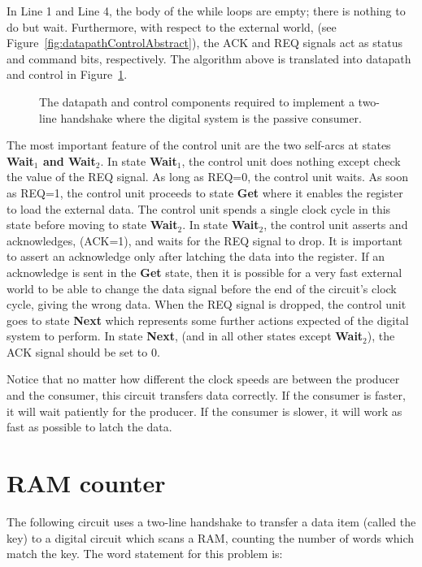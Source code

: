 In Line 1 and Line 4, the body of the while loops are empty; there is nothing
to do but wait.  Furthermore, with respect to the external world, (see
Figure~\ref{fig:datapathControlAbstract}), the ACK and REQ signals act as status and
command bits, respectively.  The algorithm above is translated into
datapath and control in Figure~\ref{fig:datapathControl2Line}.

\begin{figure}[ht]
    \caption{The datapath and control components required to implement
    a two-line handshake where the digital system is the passive consumer.}
    \label{fig:datapathControl2Line}
\end{figure}

The most important feature of the control unit are the two self-arcs
at states \textbf{ Wait$_1$ and Wait$_2$}.  In state \textbf{ Wait$_1$}, the
control unit does nothing except check the value of the REQ signal.
As long as REQ=0, the control unit waits.  As soon as REQ=1,
the control unit proceeds to state \textbf{ Get} where it enables
the register to load the external data.  The control unit spends a single
clock cycle in this state before moving to state \textbf{ Wait$_2$}.  In
state \textbf{ Wait$_2$}, the control unit asserts and acknowledges,
(ACK=1), and waits for the REQ signal to drop.  It is important
to assert an acknowledge only after latching the data into
the register.  If an acknowledge is sent in the \textbf{ Get} state,
then it is possible for a very fast external world to be
able to change the data signal before the end of the circuit's
clock cycle, giving the wrong data.  When the REQ signal is
dropped, the control unit goes to state \textbf{ Next} which represents
some further actions expected of the digital system to perform. In
state \textbf{ Next}, (and in all other states except \textbf{ Wait$_2$}),
the ACK signal should be set to 0.

Notice that no matter how different the clock speeds are between the
producer and the consumer, this circuit transfers data correctly.
If the consumer is faster, it will wait patiently for the producer.
If the consumer is slower, it will work as fast as possible to
latch the data.


\section{RAM counter}
The following circuit uses a two-line handshake to transfer a
data item (called the key) to a digital circuit which scans a
RAM, counting the number of words which match the key.  The word
statement for this problem is:

